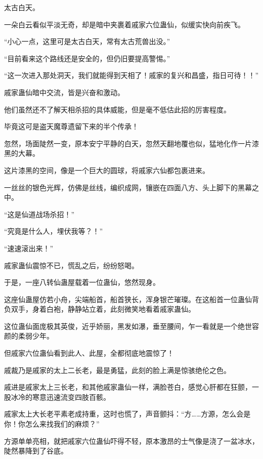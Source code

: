 
\begin{this_body}



太古白天。

一朵白云看似平淡无奇，却是暗中夹裹着戚家六位蛊仙，似缓实快向前疾飞。

“小心一点，这里可是太古白天，常有太古荒兽出没。”

“目前看来这个路线还是安全的，但仍旧要提高警惕。”

“这一次进入那处洞天，我们就能得到天相了！戚家的复兴和昌盛，指日可待！！”

戚家蛊仙暗中交流，皆是兴奋和激动。

他们虽然还不了解天相杀招的具体威能，但是毫不低估此招的厉害程度。

毕竟这可是盗天魔尊遗留下来的半个传承！

忽然，场面陡然一变，原本安宁平静的白天，忽然天翻地覆也似，猛地化作一片漆黑的大幕。

这片漆黑的空间，像是一个巨大的圆球，将戚家六仙都包裹进来。

一丝丝的银色光辉，仿佛是丝线，编织成网，镶嵌在四面八方、头上脚下的黑幕之中。

“这是仙道战场杀招！”

“究竟是什么人，埋伏我等？！”

“速速滚出来！”

戚家蛊仙震惊不已，慌乱之后，纷纷怒喝。

于是，一座八转仙蛊屋载着一位蛊仙，悠然现身。

这座仙蛊屋仿若小舟，尖端船首，船首狭长，浑身银芒璀璨。在这船首一位蛊仙背负双手，身着白袍，静静站立着，此刻微笑地看着戚家蛊仙。

这位蛊仙面庞极其英俊，近乎娇丽，黑发如瀑，垂至腰间，乍一看就是一个绝世容颜的柔弱少年。

但戚家六位蛊仙看到此人、此屋，全都彻底地震惊了！

戚裁乃是戚家的太上二长老，最是勇猛，此刻的脸上满是惊骇绝伦之色。

戚进是戚家太上三长老，和其他戚家蛊仙一样，满脸苍白，感觉心肝都在狂颤，一股冰冷的寒意迅速流变四肢百骸。

戚家太上大长老平素老成持重，这时也慌了，声音颤抖：“方……方源，怎么会是你！你怎么来找我们的麻烦？”

方源单单亮相，就把戚家六位蛊仙吓得不轻，原本激昂的士气像是浇了一盆冰水，陡然暴降到了谷底。


\end{this_body}
